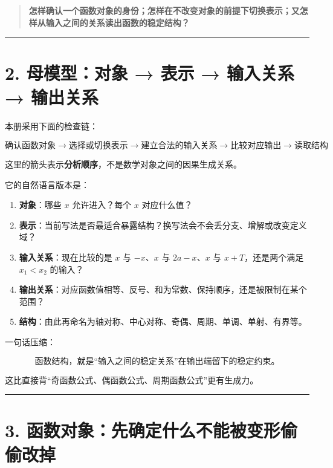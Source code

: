 \documentclass[11pt,a4paper]{ctexart}
\providecommand{\tightlist}{}
\begin{document}
\begin{quote}
\textbf{怎样确认一个函数对象的身份；怎样在不改变对象的前提下切换表示；又怎样从输入之间的关系读出函数的稳定结构？}
\end{quote}

\begin{center}\rule{0.5\linewidth}{0.5pt}\end{center}

\section{2. 母模型：对象 → 表示 → 输入关系 →
输出关系}\label{ux6bcdux6a21ux578bux5bf9ux8c61-ux8868ux793a-ux8f93ux5165ux5173ux7cfb-ux8f93ux51faux5173ux7cfb}

本册采用下面的检查链：

\[
\boxed{
\text{确认函数对象}
\to
\text{选择或切换表示}
\to
\text{建立合法的输入关系}
\to
\text{比较对应输出}
\to
\text{读取结构}
}
\]

这里的箭头表示\textbf{分析顺序}，不是数学对象之间的因果生成关系。

它的自然语言版本是：

\begin{enumerate}
\def\labelenumi{\arabic{enumi}.}
\tightlist
\item
  \textbf{对象}：哪些 \(x\) 允许进入？每个 \(x\) 对应什么值？
\item
  \textbf{表示}：当前写法是否最适合暴露结构？换写法会不会丢分支、增解或改变定义域？
\item
  \textbf{输入关系}：现在比较的是 \(x\) 与 \(-x\)、\(x\) 与
  \(2a-x\)、\(x\) 与 \(x+T\)，还是两个满足 \(x_1<x_2\) 的输入？
\item
  \textbf{输出关系}：对应函数值相等、反号、和为常数、保持顺序，还是被限制在某个范围？
\item
  \textbf{结构}：由此再命名为轴对称、中心对称、奇偶、周期、单调、单射、有界等。
\end{enumerate}

一句话压缩：

\[
\boxed{
\text{函数结构，就是“输入之间的稳定关系”在输出端留下的稳定约束。}
}
\]

这比直接背``奇函数公式、偶函数公式、周期函数公式''更有生成力。

\begin{center}\rule{0.5\linewidth}{0.5pt}\end{center}

\section{3.
函数对象：先确定什么不能被变形偷偷改掉}\label{ux51fdux6570ux5bf9ux8c61ux5148ux786eux5b9aux4ec0ux4e48ux4e0dux80fdux88abux53d8ux5f62ux5077ux5077ux6539ux6389}
\end{document}
